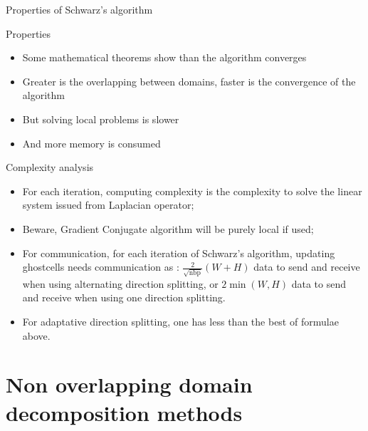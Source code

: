 \documentclass[compress,10pt,aspectratio=169]{beamer}
\begin{document}
\begin{frame}[fragile]{Properties of Schwarz's algorithm}
\scriptsize
\begin{block}{\small Properties}
  \begin{itemize}
    \item Some mathematical theorems show than the algorithm converges
    \item Greater is the overlapping between domains, faster is the convergence of the algorithm
    \item But solving local problems is slower
    \item And more memory is consumed
  \end{itemize}
\end{block}  

\begin{exampleblock}{\small Complexity analysis}
  \begin{itemize}
    \item For each iteration, computing complexity is the complexity to solve the linear system issued from Laplacian operator;
    \item Beware, Gradient Conjugate algorithm will be purely local if used;
    \item For communication, for each iteration of Schwarz's algorithm, updating ghostcells needs communication as :
    $\displaystyle \frac{2}{\sqrt{\mbox{nbp}}}\left(W + H\right)$ data to send and receive when using alternating
    direction splitting, or $2\min\left(W,H\right)$ data to send and receive when using one direction splitting.
  \item For adaptative direction splitting, one has less than the best of formulae above.
  \end{itemize}
\end{exampleblock}
\end{frame}

\section{Non overlapping domain decomposition methods}
\end{document}
